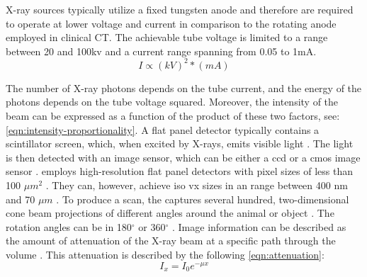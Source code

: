 \noindent
\mct\space X-ray sources typically utilize a fixed tungsten anode
 and therefore are required to operate at lower voltage and current in comparison to the rotating anode employed in clinical CT.
The achievable tube voltage is limited to a range between 20 and 100\acrshort{kv} and a current range spanning from 0.05 to 1mA.
\begin{equation}\label{eqn:intensity-proportionality}
	I \propto (kV)^{2}*(mA)
\end{equation}

\noindent
The number of X-ray photons depends on the tube current, and the energy of the photons depends on the tube voltage squared.
Moreover, the intensity of the beam can be expressed as a function of the product of these two factors, see: \cref{eqn:intensity-proportionality}.
A flat panel detector typically contains a scintillator screen, which, when excited by X-rays, emits visible light \cite{babaComparisonFlatpanelDetector2002,ritmanCurrentStatusDevelopments2011,clarkMicroCTRodentsStateart2014}.
The light is then detected with an image sensor, which can be either a \acrfull{ccd} or a \acrfull{cmos} image sensor \cite{babaComparisonFlatpanelDetector2002}.
\mct\space employs high-resolution flat panel detectors with pixel sizes of less than 100 $\mu m^{2}$ \cite{clarkAdvancesMicroCTImaging2021,clarkMicroCTRodentsStateart2014}.
They can, however, achieve \gls{iso} \gls{vx} sizes in an range between 400 nm and 70 $\mu m$ \cite{orhanMicrocomputedTomographyMicroCT2020}.
To produce a scan, the \mct\space captures several hundred, two-dimensional cone beam projections of different angles around the animal or object \cite{clarkMicroCTRodentsStateart2014,ritmanCurrentStatusDevelopments2011,clarkAdvancesMicroCTImaging2021}.
The rotation angles can be in 180$^{\circ}$ or 360$^{\circ}$ \cite{orhanMicrocomputedTomographyMicroCT2020}.
Image information can be described as the amount of attenuation of the X-ray beam at a specific path through the volume \cite{orhanMicrocomputedTomographyMicroCT2020}.
This attenuation is described by the following \cref{eqn:attenuation}:
\begin{equation}\label{eqn:attenuation}
	I_{x} = I_{0}e^{- \mu x}
\end{equation}

